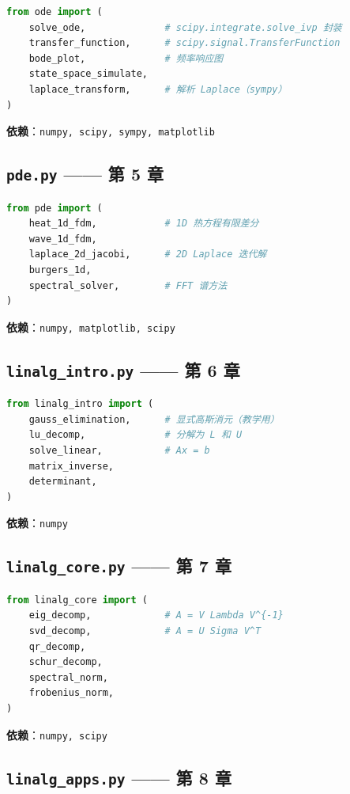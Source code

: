 \begin{lstlisting}[language=Python]
from ode import (
    solve_ode,              # scipy.integrate.solve_ivp 封装
    transfer_function,      # scipy.signal.TransferFunction
    bode_plot,              # 频率响应图
    state_space_simulate,
    laplace_transform,      # 解析 Laplace（sympy）
)
\end{lstlisting}
\textbf{依赖}：\texttt{numpy, scipy, sympy, matplotlib}

\subsection{\texttt{pde.py} —— 第 5 章}

\begin{lstlisting}[language=Python]
from pde import (
    heat_1d_fdm,            # 1D 热方程有限差分
    wave_1d_fdm,
    laplace_2d_jacobi,      # 2D Laplace 迭代解
    burgers_1d,
    spectral_solver,        # FFT 谱方法
)
\end{lstlisting}
\textbf{依赖}：\texttt{numpy, matplotlib, scipy}

\subsection{\texttt{linalg\_intro.py} —— 第 6 章}

\begin{lstlisting}[language=Python]
from linalg_intro import (
    gauss_elimination,      # 显式高斯消元（教学用）
    lu_decomp,              # 分解为 L 和 U
    solve_linear,           # Ax = b
    matrix_inverse,
    determinant,
)
\end{lstlisting}
\textbf{依赖}：\texttt{numpy}

\subsection{\texttt{linalg\_core.py} —— 第 7 章}

\begin{lstlisting}[language=Python]
from linalg_core import (
    eig_decomp,             # A = V Lambda V^{-1}
    svd_decomp,             # A = U Sigma V^T
    qr_decomp,
    schur_decomp,
    spectral_norm,
    frobenius_norm,
)
\end{lstlisting}
\textbf{依赖}：\texttt{numpy, scipy}

\subsection{\texttt{linalg\_apps.py} —— 第 8 章}

